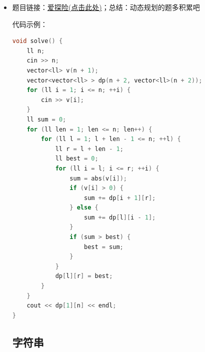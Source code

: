 \begin{itemize}
代码示例：\\
\begin{lstlisting}[language=C++]
	void solve() {
		ll n, q;
		cin >> n >> q;
		ll k = log2(n) + 3;
		vector<vector<ll> > dp(n + 1, vector<ll>(k));
		vector<vector<ll> > mp(n + 1, vector<ll>(k));
		for (ll i = 1; i <= n; ++i) {
			cin >> dp[i][0];
			mp[i][0] = dp[i][0];
		}
		//最大值和最小值必须分开做成两张ST表！
		for (ll i = 1; i <= k; ++i) {
			for (ll j = 1; j + (1 << i) - 1 <= n; ++j) {
				dp[j][i] = max(dp[j][i - 1], dp[j + (1 << (i - 1))][i - 1]);
			}
		}
		for (ll i = 1; i <= k; ++i) {
			for (ll j = 1; j + (1 << i) - 1 <= n; ++j) {
				mp[j][i] = min(mp[j][i - 1], mp[j + (1 << (i - 1))][i - 1]);
			}
		}
		//查询最大最小；
		while (q--) {
			ll l, r, mmin = 0, mmax = 0;
			cin >> l >> r;
			ll len = log2(r - l + 1);
			mmax = max(dp[l][len], dp[r - (1 << len) + 1][len]);
			mmin = min(mp[l][len], mp[r - (1 << len) + 1][len]);
			cout << mmax - mmin << endl;
		}
	}
	
\end{lstlisting}
\subsection{动态规划}
\subsubsection{PTA探险}
\item 题目链接：\href{https://pintia.cn/problem-sets/1997490617200599040/exam/problems/type/7?problemSetProblemId=1997490617559937032}{爱探险(点击此处)}；总结：动态规划的题多积累吧

代码示例：\\
\begin{lstlisting}[language=C++]
void solve() {
	ll n;
	cin >> n;
	vector<ll> v(n + 1);
	vector<vector<ll> > dp(n + 2, vector<ll>(n + 2));
	for (ll i = 1; i <= n; ++i) {
		cin >> v[i];
	}
	ll sum = 0;
	for (ll len = 1; len <= n; len++) {
		for (ll l = 1; l + len - 1 <= n; ++l) {
			ll r = l + len - 1;
			ll best = 0;
			for (ll i = l; i <= r; ++i) {
				sum = abs(v[i]);
				if (v[i] > 0) {
					sum += dp[i + 1][r];
				} else {
					sum += dp[l][i - 1];
				}
				if (sum > best) {
					best = sum;
				}
			}
			dp[l][r] = best;
		}
	}
	cout << dp[1][n] << endl;
}
\end{lstlisting}
\subsection{字符串}

\end{itemize}

